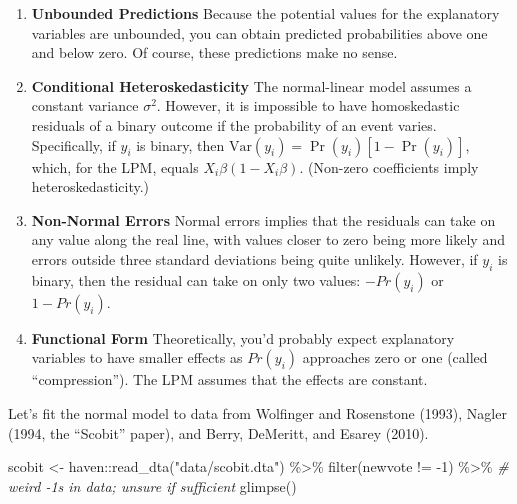 \documentclass[
]{book}
\newenvironment{Shaded}{\begin{snugshade}}{\end{snugshade}}
\newcommand{\CommentTok}[1]{\textcolor[rgb]{0.56,0.35,0.01}{\textit{#1}}}
\newcommand{\DecValTok}[1]{\textcolor[rgb]{0.00,0.00,0.81}{#1}}
\newcommand{\FunctionTok}[1]{\textcolor[rgb]{0.00,0.00,0.00}{#1}}
\newcommand{\NormalTok}[1]{#1}
\newcommand{\OtherTok}[1]{\textcolor[rgb]{0.56,0.35,0.01}{#1}}
\newcommand{\SpecialCharTok}[1]{\textcolor[rgb]{0.00,0.00,0.00}{#1}}
\newcommand{\StringTok}[1]{\textcolor[rgb]{0.31,0.60,0.02}{#1}}
\providecommand{\tightlist}{%
  \setlength{\itemsep}{0pt}\setlength{\parskip}{0pt}}
\begin{document}
\begin{enumerate}
\def\labelenumi{\arabic{enumi}.}
\tightlist
\item
  \textbf{Unbounded Predictions} Because the potential values for the explanatory variables are unbounded, you can obtain predicted probabilities above one and below zero. Of course, these predictions make no sense.
\item
  \textbf{Conditional Heteroskedasticity} The normal-linear model assumes a constant variance \(\sigma^2\). However, it is impossible to have homoskedastic residuals of a binary outcome if the probability of an event varies. Specifically, if \(y_i\) is binary, then \(\text{Var}(y_i) = \Pr(y_i)[1 - \Pr(y_i)]\), which, for the LPM, equals \(X_i\beta(1 - X_i\beta)\). (Non-zero coefficients imply heteroskedasticity.)
\item
  \textbf{Non-Normal Errors} Normal errors implies that the residuals can take on any value along the real line, with values closer to zero being more likely and errors outside three standard deviations being quite unlikely. However, if \(y_i\) is binary, then the residual can take on only two values: \(-Pr(y_i)\) or \(1 - Pr(y_i)\).
\item
  \textbf{Functional Form} Theoretically, you'd probably expect explanatory variables to have smaller effects as \(Pr(y_i)\) approaches zero or one (called ``compression''). The LPM assumes that the effects are constant.
\end{enumerate}

Let's fit the normal model to data from Wolfinger and Rosenstone (1993), Nagler (1994, the ``Scobit'' paper), and Berry, DeMeritt, and Esarey (2010).

\begin{Shaded}
\begin{Highlighting}[]
\NormalTok{scobit }\OtherTok{\textless{}{-}}\NormalTok{ haven}\SpecialCharTok{::}\FunctionTok{read\_dta}\NormalTok{(}\StringTok{"data/scobit.dta"}\NormalTok{) }\SpecialCharTok{\%\textgreater{}\%}
  \FunctionTok{filter}\NormalTok{(newvote }\SpecialCharTok{!=} \SpecialCharTok{{-}}\DecValTok{1}\NormalTok{) }\SpecialCharTok{\%\textgreater{}\%}  \CommentTok{\# weird {-}1s in data; unsure if sufficient}
  \FunctionTok{glimpse}\NormalTok{()}
\end{Highlighting}
\end{Shaded}
\end{document}
